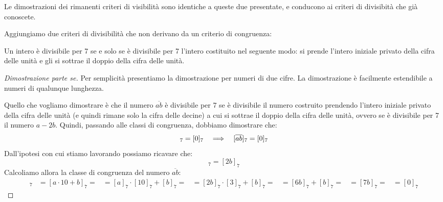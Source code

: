 Le dimostrazioni dei rimanenti criteri di visibilità sono identiche a queste due presentate, e conducono ai criteri di divisibità che già conoscete.

Aggiungiamo due criteri di divisibilità che non derivano da un criterio di congruenza:

\begin{mdframed}
    \begin{teorema}
        Un intero è divisibile per 7 se e solo se è divisibile per 7 l'intero costituito nel seguente modo: si prende l'intero iniziale privato della cifra delle unità e gli si sottrae il doppio della cifra delle unità.
    \end{teorema}
    \begin{proof}[Dimostrazione parte se]
        Per semplicità presentiamo la dimostrazione per numeri di due cifre. La dimostrazione è facilmente estendibile a numeri di qualunque lunghezza.

        Quello che vogliamo dimostrare è che il numero $\overline{ab}$ è divisibile per 7 se è divisibile il numero costruito prendendo l'intero iniziale privato della cifra delle unità (e quindi rimane solo la cifra delle decine) a cui si sottrae il doppio della cifra delle unità, ovvero se è divisibile per 7 il numero $a - 2b$. Quindi, passando alle classi di congruenza, dobbiamo dimostrare che:
        \begin{equation*}
            [a - 2b]_7 = [0]_7 \allora [\overline{ab}]_7 = [0]_7
        \end{equation*}
        Dall'ipotesi con cui stiamo lavorando possiamo ricavare che:
        \begin{equation*}
            [a]_7 = [2b]_7
        \end{equation*}
        Calcoliamo allora la classe di congruenza del numero $\overline{ab}$:
        \begin{align*}
            [\overline{ab}]_7 &= [a \cdot 10 + b]_7 =
            &= [a]_7 \cdot [10]_7 + [b]_7 =
            &= [2b]_7 \cdot [3]_7 + [b]_7 =
            &= [6b]_7 + [b]_7 =
            &= [7b]_7 =
            &= [0]_7
        \end{align*}

        
    \end{proof}
\end{mdframed}

